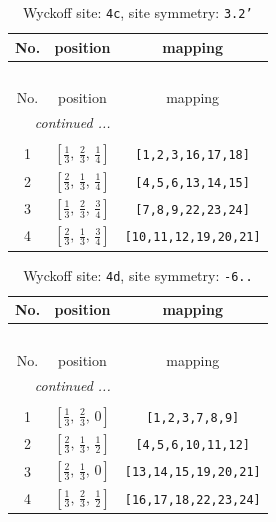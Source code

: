 \documentclass[fleqn,8pt]{jsarticle}
\begin{document}
\renewcommand{\arraystretch}{1.2}
\begin{longtable}{ccc}
\caption{Wyckoff site: {\tt 4c}, site symmetry: {\tt 3.2'}}
 \\
 \hline \hline
No. & position & mapping \\ \hline \endfirsthead

\multicolumn{2}{l}{\tablename\ \thetable{}} \\
 \hline \hline
No. & position & mapping \\ \hline \endhead

 \hline \hline
\multicolumn{2}{r}{\footnotesize\it continued ...} \\ \endfoot

 \hline \hline
\multicolumn{2}{r}{} \\ \endlastfoot

1 & $\left[ \frac{1}{3},\, \frac{2}{3},\, \frac{1}{4} \right]$ & {\tt [1,2,3,16,17,18]} \\ \hline
2 & $\left[ \frac{2}{3},\, \frac{1}{3},\, \frac{1}{4} \right]$ & {\tt [4,5,6,13,14,15]} \\ \hline
3 & $\left[ \frac{1}{3},\, \frac{2}{3},\, \frac{3}{4} \right]$ & {\tt [7,8,9,22,23,24]} \\ \hline
4 & $\left[ \frac{2}{3},\, \frac{1}{3},\, \frac{3}{4} \right]$ & {\tt [10,11,12,19,20,21]} \\
\end{longtable}
\renewcommand{\arraystretch}{1.2}
\begin{longtable}{ccc}
\caption{Wyckoff site: {\tt 4d}, site symmetry: {\tt -6..}}
 \\
 \hline \hline
No. & position & mapping \\ \hline \endfirsthead

\multicolumn{2}{l}{\tablename\ \thetable{}} \\
 \hline \hline
No. & position & mapping \\ \hline \endhead

 \hline \hline
\multicolumn{2}{r}{\footnotesize\it continued ...} \\ \endfoot

 \hline \hline
\multicolumn{2}{r}{} \\ \endlastfoot

1 & $\left[ \frac{1}{3},\, \frac{2}{3},\, 0 \right]$ & {\tt [1,2,3,7,8,9]} \\ \hline
2 & $\left[ \frac{2}{3},\, \frac{1}{3},\, \frac{1}{2} \right]$ & {\tt [4,5,6,10,11,12]} \\ \hline
3 & $\left[ \frac{2}{3},\, \frac{1}{3},\, 0 \right]$ & {\tt [13,14,15,19,20,21]} \\ \hline
4 & $\left[ \frac{1}{3},\, \frac{2}{3},\, \frac{1}{2} \right]$ & {\tt [16,17,18,22,23,24]} \\
\end{longtable}
\end{document}
